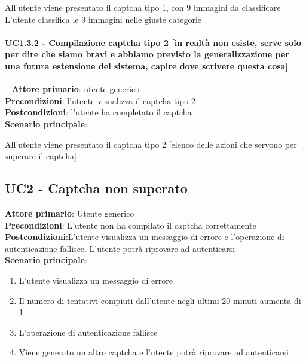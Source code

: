 All'utente viene presentato il captcha tipo 1, con 9 immagini da classificare
L'utente classifica le 9 immagini nelle giuste categorie


\paragraph{UC1.3.2 - Compilazione captcha tipo 2 [in realtà non esiste, serve solo per dire che siamo bravi e abbiamo previsto la generalizzazione per una futura estensione del sistema, capire dove scrivere questa cosa]}~\smallskip
\textbf{Attore primario}: utente generico\\
\textbf{Precondizioni}: l'utente visualizza il captcha tipo 2\\
\textbf{Postcondizioni}: l'utente ha completato il captcha\\
\textbf{Scenario principale}:

All'utente viene presentato il captcha tipo 2
[elenco delle azioni che servono per superare il captcha]

\subsection{UC2 - Captcha non superato}
\textbf{Attore primario}: Utente generico\\
\textbf{Precondizioni}: L'utente non ha compilato il captcha correttamente\\
\textbf{Postcondizioni}:L'utente visualizza un messaggio di errore e l'operazione di autenticazione fallisce. L'utente potrà riprovare ad autenticarsi\\
\textbf{Scenario principale}:
\begin{enumerate}
   \item L'utente visualizza un messaggio di errore
   \item Il numero di tentativi compiuti dall'utente negli ultimi 20 minuti aumenta di 1
   \item L'operazione di autenticazione fallisce
   \item Viene generato un altro captcha e l'utente potrà riprovare ad autenticarsi
\end{enumerate}

